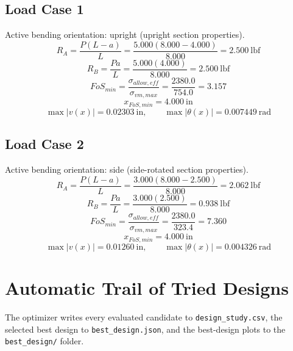 \documentclass[11pt]{article}
\begin{document}
\subsection*{Load Case 1}
Active bending orientation: upright (upright section properties).
\[R_A = \frac{P(L-a)}{L} = \frac{5.000(8.000-4.000)}{8.000} = 2.500\ \mathrm{lbf}\]
\[R_B = \frac{Pa}{L} = \frac{5.000(4.000)}{8.000} = 2.500\ \mathrm{lbf}\]
\[FoS_{min} = \frac{\sigma_{allow,eff}}{\sigma_{vm,max}} = \frac{2380.0}{754.0} = 3.157\]
\[x_{FoS,min} = 4.000\ \mathrm{in}\]
\[\max |v(x)| = 0.02303\ \mathrm{in}, \qquad \max |\theta(x)| = 0.007449\ \mathrm{rad}\]
\subsection*{Load Case 2}
Active bending orientation: side (side-rotated section properties).
\[R_A = \frac{P(L-a)}{L} = \frac{3.000(8.000-2.500)}{8.000} = 2.062\ \mathrm{lbf}\]
\[R_B = \frac{Pa}{L} = \frac{3.000(2.500)}{8.000} = 0.938\ \mathrm{lbf}\]
\[FoS_{min} = \frac{\sigma_{allow,eff}}{\sigma_{vm,max}} = \frac{2380.0}{323.4} = 7.360\]
\[x_{FoS,min} = 4.000\ \mathrm{in}\]
\[\max |v(x)| = 0.01260\ \mathrm{in}, \qquad \max |\theta(x)| = 0.004326\ \mathrm{rad}\]

\section*{Automatic Trail of Tried Designs}
The optimizer writes every evaluated candidate to \texttt{design\_study.csv}, the selected best design to \texttt{best\_design.json}, and the best-design plots to the \texttt{best\_design/} folder.
\end{document}
